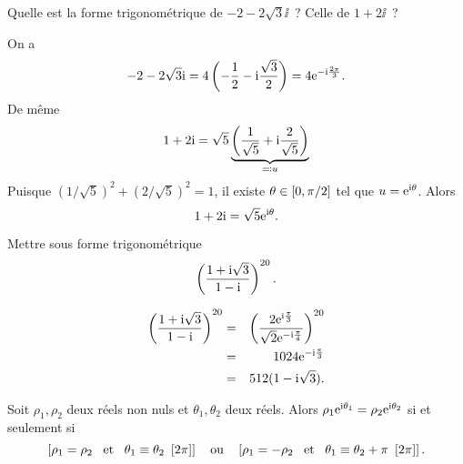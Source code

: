 \documentclass{magnolia}
\begin{document}
\begin{exos}
\exo Quelle est la forme trigonométrique de $-2-2\sqrt{3}\ii$~? Celle de $1+2\ii$~?
\begin{sol}
On a
\[-2-2\sqrt{3}{\rm i}=4\left(-\frac{1}{2}-{\rm i}\frac{\sqrt{3}}{2}\right)=4{\rm e}^{-{\rm i}\frac{2\pi}{3}}.\]
De même
\[1+2{\rm i}=\sqrt{5}\underbrace{\left(\frac{1}{\sqrt{5}}+{\rm i}\frac{2}{\sqrt{5}}\right)}_{\eqqcolon u}\]
Puisque $(1/\sqrt{5})^2+(2/\sqrt{5})^2=1$, il existe $\theta\in\left[0,\pi/2\right]$ tel que $u={\rm e}^{{\rm i}\theta}$. Alors
\[1+2{\rm i}=\sqrt{5}{\rm e}^{{\rm i}\theta}.\]
\end{sol}
\exo Mettre sous forme trigonométrique
  \[\left(\frac{1+{\rm i} \sqrt{3}}{1-{\rm i}}\right)^{20}.\]
\begin{sol}
\begin{eqnarray*}
\left(\frac{1+{\rm i} \sqrt{3}}{1-{\rm i}}\right)^{20}
&=& \left(\frac{2{\rm e}^{{\rm i}\frac{\pi}{3}}}{\sqrt{2}{\rm e}^{-{\rm i}\frac{\pi}{4}}}\right)^{20}\\
&=& 1024{\rm e}^{-{\rm i}\frac{\pi}{3}}\\
&=& 512(1-{\rm i}\sqrt{3}).
\end{eqnarray*}
\end{sol}
\end{exos}

\begin{proposition}[utile=-3]
Soit $\rho_1,\rho_2$ deux réels non nuls et $\theta_1,\theta_2$ deux réels.
Alors $\rho_1 {\rm e}^{{\rm i}\theta_1}=\rho_2 {\rm e}^{{\rm i}\theta_2}$ si et seulement si
\[\cro{\rho_1=\rho_2 \et \theta_1\equiv\theta_2\ \cro{2\pi}} \quad \text{ou}
  \quad \cro{\rho_1=-\rho_2 \et \theta_1\equiv\theta_2+\pi\ \cro{2\pi}}.\]
\end{proposition}
\end{document}

